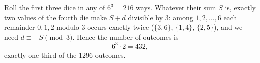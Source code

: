 Roll the first three dice in any of $6^3=216$ ways. Whatever their sum $S$ is, exactly two values of the fourth die make $S+d$ divisible by $3$: among $1,2,\dots,6$ each remainder $0,1,2$ modulo $3$ occurs exactly twice ($\{3,6\}$, $\{1,4\}$, $\{2,5\}$), and we need $d\equiv-S\pmod3$. Hence the number of outcomes is
\[6^3\cdot2=\boxed{432},\]
exactly one third of the $1296$ outcomes.
